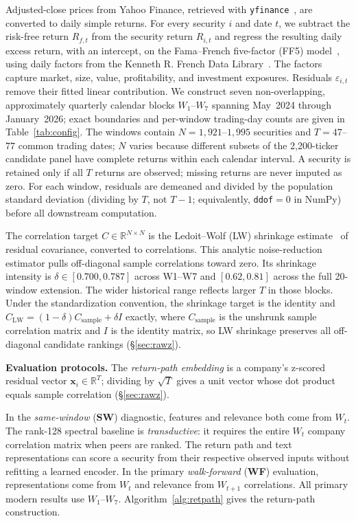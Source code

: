 \documentclass[sigconf,anonymous]{acmart}
\begin{document}
Adjusted-close prices from Yahoo Finance, retrieved with
\texttt{yfinance}~\citep{yahoo_finance}, are converted to daily simple returns.
For every security $i$ and date $t$, we subtract the risk-free return $R_{f,t}$
from the security return $R_{i,t}$ and regress the resulting daily excess return,
with an intercept, on the Fama--French five-factor (FF5)
model~\citep{fama2015five}, using daily factors from the Kenneth R. French Data
Library~\citep{french_data_library}.  The factors capture market,
size, value, profitability, and investment exposures.  Residuals
$\varepsilon_{i,t}$ remove their fitted linear contribution.
We construct seven non-overlapping, approximately quarterly calendar blocks
$W_1$--$W_7$ spanning May~2024 through January~2026; exact boundaries and
per-window trading-day counts are given in Table~\ref{tab:config}.
The windows contain $N=1{,}921$--$1{,}995$ securities and $T=47$--$77$ common
trading dates; $N$ varies because different subsets of the 2{,}200-ticker
candidate panel have complete returns within each calendar interval.
A security is retained only if all $T$ returns are observed;
missing returns are never imputed as zero.
For each window, residuals are demeaned and divided by the population standard
deviation (dividing by $T$, not $T-1$; equivalently, \texttt{ddof}$=0$ in NumPy)
before all downstream computation.

The correlation target $C \in \mathbb{R}^{N \times N}$ is the Ledoit--Wolf (LW)
shrinkage estimate~\citep{ledoit2004well} of residual covariance, converted to
correlations.  This analytic noise-reduction estimator pulls off-diagonal sample
correlations toward zero.
Its shrinkage intensity is $\delta \in [0.700, 0.787]$ across W1--W7 and
$[0.62, 0.81]$ across the full 20-window extension.  The wider historical range
reflects larger $T$ in those blocks.  Under the standardization convention, the shrinkage target is the identity and
$C_{\mathrm{LW}} = (1-\delta)C_{\mathrm{sample}} + \delta I$ exactly, where
$C_{\mathrm{sample}}$ is the unshrunk sample correlation matrix and $I$ is the
identity matrix, so LW shrinkage preserves all off-diagonal candidate rankings
(\S\ref{sec:rawz}).

\textbf{Evaluation protocols.}
The \emph{return-path embedding} is a company's
z-scored residual vector $\mathbf{x}_i \in \mathbb{R}^T$; dividing by $\sqrt T$
gives a unit vector whose dot product equals sample correlation
(\S\ref{sec:rawz}).

In the \emph{same-window} (\textbf{SW}) diagnostic, features and relevance both
come from $W_t$.  The rank-128 spectral baseline is \emph{transductive}: it
requires the entire $W_t$ company correlation matrix when peers are ranked.
The return path and text representations can score a security from their
respective observed inputs without refitting a learned encoder.  In the primary
\emph{walk-forward} (\textbf{WF}) evaluation, representations come from $W_t$
and relevance from $W_{t+1}$ correlations.
All primary modern results use $W_1$--$W_7$.
Algorithm~\ref{alg:retpath} gives the return-path construction.
\end{document}

